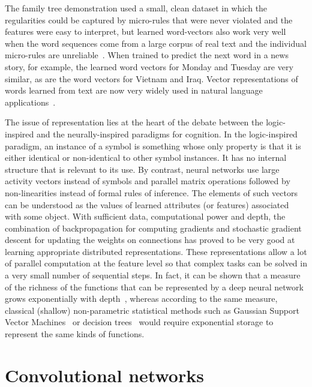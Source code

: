 \documentclass[10pts]{article}
\begin{document}
The family tree demonstration used a small, clean dataset in which the
regularities could be captured by micro-rules that were never violated and
the features were easy to interpret, but learned word-vectors also work
very well when the word sequences come from a large corpus of real text and
the individual micro-rules are unreliable~\citep{BenDucVin01-short}. When trained to
predict the next word in a news story, for example, the learned word
vectors for Monday and Tuesday are very similar, as are the word vectors
for Vietnam and Iraq.  Vector representations of words learned from text
are now very widely used in natural language 
applications~\citep{Schwenk-2007,collobert:2011b,Socher-2011,Mikolov-et-al-NIPS2013}.

The issue of representation lies at the heart of the debate between the
logic-inspired and the neurally-inspired paradigms for cognition. In the
logic-inspired paradigm, an instance of a symbol is something whose only
property is that it is either identical or non-identical to other symbol
instances. It has no internal structure that is relevant to its use. By
contrast, neural networks use large activity vectors instead of symbols and
parallel matrix operations followed by non-linearities instead of formal
rules of inference. The elements of such vectors can be understood as
the values of learned attributes (or features) associated with some object. 
With sufficient data, computational power and depth,
the combination of backpropagation for computing gradients and stochastic
gradient descent for updating the weights on connections has proved to be
very good at learning appropriate distributed representations. These
representations allow a lot of parallel computation at the feature level so
that complex tasks can be solved in a very small number of sequential
steps. In fact, it can be shown that a measure of the richness of the functions
that can be represented by a deep neural network grows exponentially
with depth~\citep{Montufar-et-al-NIPS2014}, whereas according to the
same measure, classical (shallow) non-parametric statistical methods such as
Gaussian Support Vector Machines~\citep{Bengio-localfailure-NIPS-2006-small} 
or decision trees~\citep{Bengio-decision-trees10}
would require exponential storage 
to represent the same kinds of functions.

\section{Convolutional networks}
\end{document}
